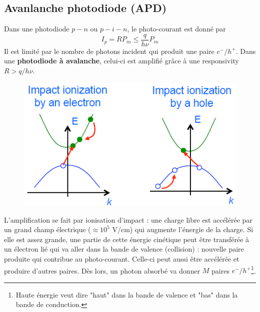 \subsection{Avanlanche photodiode (APD)}
Dans une photodiode $p-n$ ou $p-i-n$, le photo-courant est donné par
\begin{equation}
{I_p} = R{P_{in}} \le \frac{q}{{h\nu }}{P_{in}}
\end{equation}
Il est limité par le nombre de photons incident qui produit une paire $e^-/h^+$. Dans une
\textbf{photodiode à avalanche}, celui-ci est amplifié grâce à une responsivity $R>q/h\nu$.\\

\begin{figure}
\vspace{-5mm}
\includegraphics[scale=0.5]{ch5/image6}
\end{figure}
L'amplification se fait par ionisation d'impact : une charge libre est accélérée par un grand
champ électrique ($\approx10^5$ V/cm) qui augmente l'énergie de la charge. Si elle est 
assez grande, une partie de cette énergie cinétique peut être transférée à un électron lié qui
va aller dans la bande de valence (collision) : nouvelle paire produite qui contribue au 
photo-courant. Celle-ci peut aussi être accélérée et produire d'autres paires. Dès lors, un photon
absorbé va donner $M$ paires $e^-/h^+$\footnote{Haute énergie veut dire "haut" dans la bande de 
valence et "bas" dans la bande de conduction.}.\\

